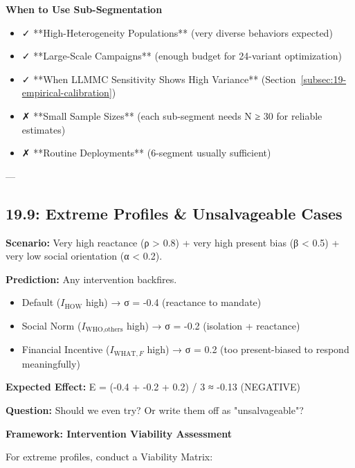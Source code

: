 \textbf{When to Use Sub-Segmentation}

\begin{itemize}[nosep]
\item ✓ **High-Heterogeneity Populations** (very diverse behaviors expected)
\item ✓ **Large-Scale Campaigns** (enough budget for 24-variant optimization)
\item ✓ **When LLMMC Sensitivity Shows High Variance** (Section~\ref{subsec:19-empirical-calibration})
\item ✗ **Small Sample Sizes** (each sub-segment needs N ≥ 30 for reliable estimates)
\item ✗ **Routine Deployments** (6-segment usually sufficient)
\end{itemize}

---

\subsection{19.9: Extreme Profiles \& Unsalvageable Cases}
\label{subsec:19-extreme-cases}

\begin{tcolorbox}[colback=red!5!white, colframe=red!75!black, title=\textbf{Problem: Some people might be RESISTANT to all interventions}]

\textbf{Scenario:} Very high reactance (ρ > 0.8) + very high present bias (β < 0.5) + very low social orientation (α < 0.2).

\textbf{Prediction:} Any intervention backfires.
\begin{itemize}[nosep]
\item Default ($I_{\text{HOW}}$ high) → σ = -0.4 (reactance to mandate)
\item Social Norm ($I_{\text{WHO},\text{others}}$ high) → σ = -0.2 (isolation + reactance)
\item Financial Incentive ($I_{\text{WHAT},F}$ high) → σ = 0.2 (too present-biased to respond meaningfully)
\end{itemize}

\textbf{Expected Effect:} E = (-0.4 + -0.2 + 0.2) / 3 ≈ -0.13 (NEGATIVE)

\textbf{Question:} Should we even try? Or write them off as "unsalvageable"?

\end{tcolorbox}

\textbf{Framework: Intervention Viability Assessment}

For extreme profiles, conduct a Viability Matrix:

